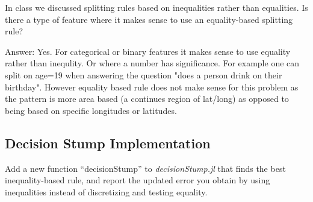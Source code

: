 \documentclass{article}
\def\ans#1{\par\gre{Answer: #1}}
\def\blu#1{{\color{blu}#1}}
\def\gre#1{{\color{gre}#1}}
\begin{document}
In class we discussed splitting rules based on inequalities rather than equalities. \blu{Is there a type of feature where it makes sense to use 
an equality-based splitting rule?}

\ans{
	Yes. For categorical or binary features it makes sense to use equality rather than inequlity. Or where a number has significance. For example one can split on age=19 when answering the question "does a person drink on their birthday". However equality based rule does not make sense for this problem as the pattern is more area based (a continues region of lat/long) as opposed to being based on specific longitudes or latitudes.
}

\subsection{Decision Stump Implementation}

\blu{Add a new function ``decisionStump'' to \emph{decisionStump.jl} that finds the best inequality-based rule, and report the updated error you obtain by using inequalities instead of discretizing and testing equality.}
\end{document}
